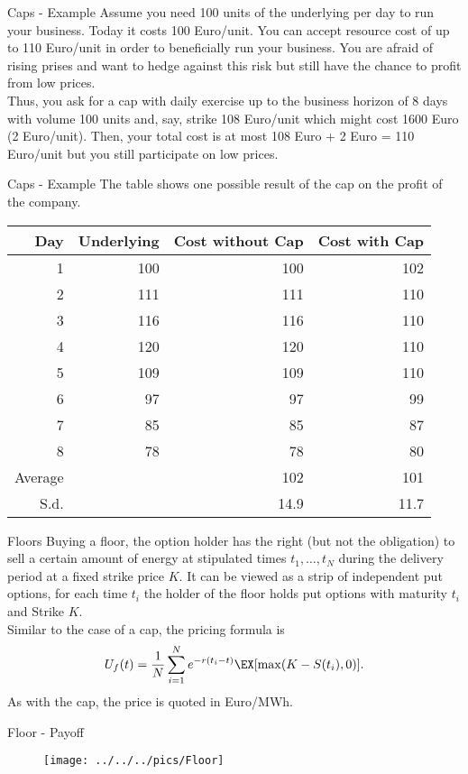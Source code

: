 {Caps - Example}
Assume you need 100 units of the underlying per day to run your business. Today it costs 100 Euro/unit. You can accept resource cost of up to 110 Euro/unit in order to beneficially run your business. You are afraid of rising prises and want to hedge against this risk but still have the chance to profit from low prices.\\
Thus, you ask for a cap with daily exercise up to the business horizon of 8 days with volume 100 units and, say, strike 108 Euro/unit which might cost 1600 Euro (2 Euro/unit). Then, your total cost is at most 108 Euro + 2 Euro = 110 Euro/unit but you still participate on low prices.

{Caps - Example}
The table shows one possible result of the cap on the profit of the company.
\begin{tabular}{rrrr}
       Day & Underlying & Cost without Cap & Cost with Cap \\
\hline
         1 &        100 &        100 &        102 \\
         2 &        111 &        111 &        110 \\
         3 &        116 &        116 &        110 \\
         4 &        120 &        120 &        110 \\
         5 &        109 &        109 &        110 \\
         6 &         97 &         97 &         99 \\
         7 &         85 &         85 &         87 \\
         8 &         78 &         78 &         80 \\
\hline
   Average &            &        102 &        101 \\
   S.d.&&14.9&11.7
\end{tabular}

{Floors}
Buying a floor, the option holder has the right (but not the
obligation) to sell a certain amount of energy at stipulated times
$t_1,\ldots,t_N$ during the delivery period at a fixed strike
price $K$. It can be viewed as a strip of
independent put options, for each time $t_i$ the holder of the floor holds put options with maturity $t_i$ and Strike $K$. \\
Similar to the case of a cap, the pricing formula is
$$U_f(t)=\frac{1}{N}\sum_{i=1}^Ne^{-r(t_i-t)}\EX[\max(K-S(t_i),0)].$$
As with the cap, the price is quoted in Euro/MWh.

{Floor - Payoff}
\begin{figure}
	\centering
		\texttt{[image: ../../../pics/Floor]}
	\label{fig:Floor}
\end{figure}

